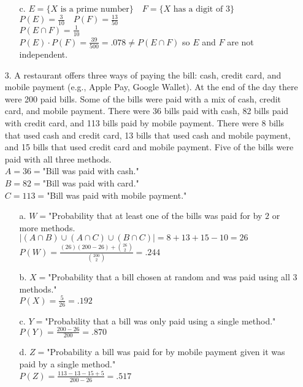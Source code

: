 \documentclass[11pt]{amsart}
\theoremstyle{definition}
\begin{document}
\begin{itemize}
\begin{itemize}
    \item[c.] $E=\{X\text{ is a prime number}\} \quad F=\{X\text{ has a digit of }3\}$ \\
              $P(E)=\frac 3{10}\quad P(F)= \frac{13}{50}$ \\
              $P(E\cap F)= \frac 1{10}$ \\
              $P(E)\cdot P(F)=\frac{39}{500}=.078\ne P(E\cap F)$ so $E$ and $F$ are not independent.
    
\end{itemize}

\item[3.] A restaurant offers three ways of paying the bill: cash, credit card, and mobile payment (e.g., Apple Pay, Google Wallet). At the end of the day there were 200
paid bills. Some of the bills were paid with a mix of cash, credit card, and mobile payment. There were 36 bills paid with cash, 82 bills paid with credit card, and 113 bills paid by mobile payment. There were 8 bills that used cash and credit card, 13 bills that used cash and mobile payment, and 15 bills that used credit card and mobile payment. Five of the bills were paid with all three methods.\\
$A=36=$"Bill was paid with cash." \\
$B=82=$"Bill was paid with card." \\
$C=113=$"Bill was paid with mobile payment."
\begin{itemize}
    \item[a.] $W=$"Probability that at least one of the bills was paid for by $2$ or more methods. \\
              $|(A\cap B)\cup(A\cap C)\cup(B\cap C)|=8+13+15-10=26$ \\
              $P(W)= \frac{(26)(200-26)+{26\choose 2}}{{200\choose 2}}=.244$

    \item[b.] $X=$"Probability that a bill chosen at random and was paid using all $3$ methods." \\
              $P(X)=\frac{5}{26}=.192$

    \item[c.] $Y=$"Probability that a bill was only paid using a single method." \\
              $P(Y)=\frac{200-26}{200}=.870$

    \item[d.] $Z=$"Probability a bill was paid for by mobile payment given it was paid by a single method." \\
              $P(Z)=\frac{113-13-15+5}{200-26}=.517$
    

\end{itemize}
\end{itemize}
\end{document}
